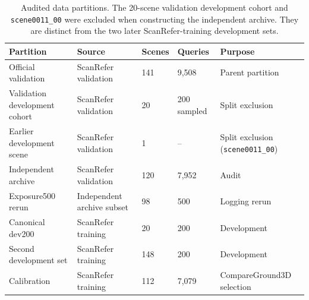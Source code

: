 \begin{table}[t]
\centering
\caption{Audited data partitions. The 20-scene validation development cohort and \texttt{scene0011\_00} were excluded when constructing the independent archive. They are distinct from the two later ScanRefer-training development sets.}
\label{tab:audited_partitions}
\begin{tabular}{lllll}
\toprule
Partition & Source & Scenes & Queries & Purpose \\
\midrule
Official validation & ScanRefer validation & 141 & 9,508 & Parent partition \\
Validation development cohort & ScanRefer validation & 20 & 200 sampled & Split exclusion \\
Earlier development scene & ScanRefer validation & 1 & -- & Split exclusion (\texttt{scene0011\_00}) \\
Independent archive & ScanRefer validation & 120 & 7,952 & Audit \\
Exposure500 rerun & Independent archive subset & 98 & 500 & Logging rerun \\
Canonical dev200 & ScanRefer training & 20 & 200 & Development \\
Second development set & ScanRefer training & 148 & 200 & Development \\
Calibration & ScanRefer training & 112 & 7,079 & CompareGround3D selection \\
\bottomrule
\end{tabular}
\end{table}
